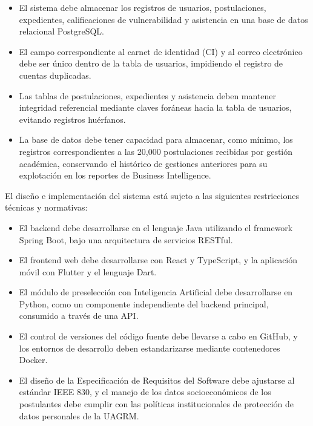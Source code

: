 \begin{itemize}
    \item El sistema debe almacenar los registros de usuarios, postulaciones, expedientes, calificaciones de vulnerabilidad y asistencia en una base de datos relacional PostgreSQL.
    \item El campo correspondiente al carnet de identidad (CI) y al correo electrónico debe ser único dentro de la tabla de usuarios, impidiendo el registro de cuentas duplicadas.
    \item Las tablas de postulaciones, expedientes y asistencia deben mantener integridad referencial mediante claves foráneas hacia la tabla de usuarios, evitando registros huérfanos.
    \item La base de datos debe tener capacidad para almacenar, como mínimo, los registros correspondientes a las 20,000 postulaciones recibidas por gestión académica, conservando el histórico de gestiones anteriores para su explotación en los reportes de Business Intelligence.
\end{itemize}

\label{sec:ieee_restricciones_diseno}

El diseño e implementación del sistema está sujeto a las siguientes restricciones técnicas y normativas:

\begin{itemize}
    \item El backend debe desarrollarse en el lenguaje Java utilizando el framework Spring Boot, bajo una arquitectura de servicios RESTful.
    \item El frontend web debe desarrollarse con React y TypeScript, y la aplicación móvil con Flutter y el lenguaje Dart.
    \item El módulo de preselección con Inteligencia Artificial debe desarrollarse en Python, como un componente independiente del backend principal, consumido a través de una API.
    \item El control de versiones del código fuente debe llevarse a cabo en GitHub, y los entornos de desarrollo deben estandarizarse mediante contenedores Docker.
    \item El diseño de la Especificación de Requisitos del Software debe ajustarse al estándar IEEE 830, y el manejo de los datos socioeconómicos de los postulantes debe cumplir con las políticas institucionales de protección de datos personales de la UAGRM.
\end{itemize}

